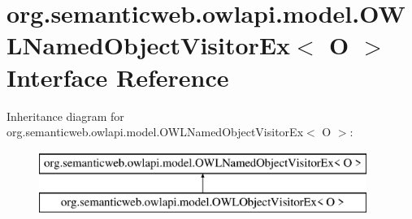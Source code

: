 \hypertarget{interfaceorg_1_1semanticweb_1_1owlapi_1_1model_1_1_o_w_l_named_object_visitor_ex_3_01_o_01_4}{\section{org.\-semanticweb.\-owlapi.\-model.\-O\-W\-L\-Named\-Object\-Visitor\-Ex$<$ O $>$ Interface Reference}
\label{interfaceorg_1_1semanticweb_1_1owlapi_1_1model_1_1_o_w_l_named_object_visitor_ex_3_01_o_01_4}
}
Inheritance diagram for org.\-semanticweb.\-owlapi.\-model.\-O\-W\-L\-Named\-Object\-Visitor\-Ex$<$ O $>$\-:\begin{figure}[H]
\begin{center}
\leavevmode
\includegraphics[height=2.000000cm]{interfaceorg_1_1semanticweb_1_1owlapi_1_1model_1_1_o_w_l_named_object_visitor_ex_3_01_o_01_4}
\end{center}
\end{figure}
